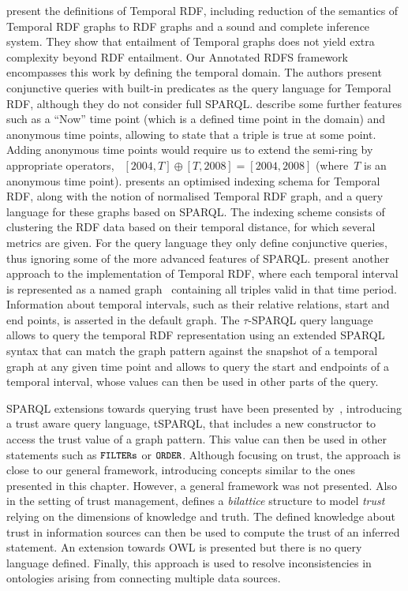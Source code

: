 \citet{GutierrezHurtadoVaisman:2007aa} present the definitions of Temporal RDF, including reduction of the semantics of
Temporal RDF graphs to RDF graphs and a sound and complete inference system.  They show that entailment of Temporal
graphs does not yield extra complexity beyond RDF entailment.  Our Annotated RDFS framework encompasses this work by
defining the temporal domain.  The authors present conjunctive queries with built-in predicates as the query language
for Temporal RDF, although they do not consider full SPARQL.
%
\citet{GutierrezHurtadoVaisman:2007aa} describe some further features such as a ``Now'' time point (which is a defined
time point in the domain) and anonymous time points, allowing to state that a triple is true at some point. Adding
anonymous time points would require us to extend the semi-ring by appropriate operators, \eg~$[2004, T] \oplus [T, 2008]
= [2004,2008]$ (where~$T$ is an anonymous time point).
% 
\citet{PuglieseUdreaSubrahmanian:2008aa} presents an optimised indexing schema for Temporal RDF, along with the notion
of normalised Temporal RDF graph, and a query language for these graphs based on SPARQL.  The indexing scheme consists
of clustering the RDF data based on their temporal distance, for which several metrics are given.  For the query
language they only define conjunctive queries, thus ignoring some of the more advanced features of SPARQL.
%
\citet{TappoletBernstein:2009aa} present another approach to the implementation of Temporal RDF, where each temporal
interval is represented as a named graph~\citep{CarrollBizerHayes:2005aa} containing all triples valid in that time
period. Information about temporal intervals, such as their relative relations, start and end points, is asserted in the
default graph.  The $\tau$-SPARQL query language allows to query the temporal RDF representation using an extended
SPARQL syntax that can match the graph pattern against the snapshot of a temporal graph at any given time point and
allows to query the start and endpoints of a temporal interval, whose values can then be used in other parts of the
query.

SPARQL extensions towards querying trust have been presented by~\citet{Hartig:2009ab}, introducing a trust aware query
language, tSPARQL, that includes a new constructor to access the trust value of a graph pattern.  This value can then be
used in other statements such as $\texttt{{\small FILTER{s}}}$ or $\texttt{{\small ORDER}}$.  Although focusing on trust, the approach
is close to our general framework, introducing concepts similar to the ones presented in this chapter.  However, a
general framework was not presented.
%
Also in the setting of trust management, \citet{Schenk:2008aa} defines a \emph{bilattice} structure to model
\emph{trust} relying on the dimensions of knowledge and truth.  The defined knowledge about trust in information sources
can then be used to compute the trust of an inferred statement. An extension towards \ac{OWL} is presented but there is
no query language defined.  Finally, this approach is used to resolve inconsistencies in ontologies arising from
connecting multiple data sources.



